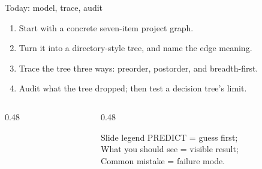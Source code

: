 \begin{frame}{Today: model, trace, audit}
\begin{enumerate}
\item Start with a concrete seven-item project graph.
\item Turn it into a directory-style tree, and name the edge meaning.
\item Trace the tree three ways: preorder, postorder, and breadth-first.
\item Audit what the tree dropped; then test a decision tree's limit.
\end{enumerate}
\begin{columns}[T]
\begin{column}{0.48\textwidth}
\end{column}
\begin{column}{0.48\textwidth}
\begin{alertblock}{Slide legend}
\textcolor{blue!60!black}{PREDICT} = guess first;\\
\textcolor{green!40!black}{What you should see} = visible result;\\
\textcolor{red!60!black}{Common mistake} = failure mode.
\end{alertblock}
\end{column}
\end{columns}
\end{frame}

